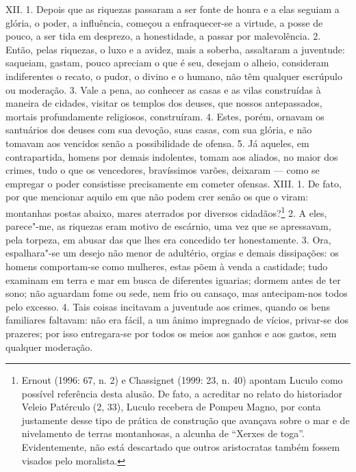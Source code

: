 XII. 1. Depois que as riquezas passaram a ser fonte de honra e a elas seguiam a
glória, o poder, a influência, começou a enfraquecer-se a virtude, a posse de
pouco, a ser tida em desprezo, a honestidade, a passar por malevolência. 2.
Então, pelas riquezas, o luxo e a avidez, mais a soberba, assaltaram a
juventude: saqueiam, gastam, pouco apreciam o que é seu, desejam o alheio,
consideram indiferentes o recato, o pudor, o divino e o humano, não têm
qualquer escrúpulo ou moderação. 3. Vale a pena, ao conhecer as casas e as
vilas construídas à maneira de cidades, visitar os templos dos deuses, que
nossos antepassados, mortais profundamente religiosos, construíram. 4. Estes,
porém, ornavam os santuários dos deuses com sua devoção, suas casas, com sua
glória, e não tomavam aos vencidos senão a possibilidade de ofensa. 5. Já
aqueles, em contrapartida, homens por demais indolentes, tomam aos aliados, no
maior dos crimes, tudo o que os vencedores, bravíssimos varões, deixaram ---
como se empregar o poder consistisse precisamente em cometer ofensas.  XIII. 1.
De fato, por que mencionar aquilo em que não podem crer senão os que o viram:
montanhas postas abaixo, mares aterrados por diversos cidadãos?\footnote{Ernout
(1996: 67, n. 2) e Chassignet (1999: 23, n. 40) apontam Luculo como
possível referência desta alusão. De fato, a acreditar no relato do historiador
Veleio Patérculo (2, 33), Luculo recebera de Pompeu Magno, por conta justamente
desse tipo de prática de construção que avançava sobre o mar e de nivelamento
de terras montanhosas, a alcunha de ``Xerxes de toga''. Evidentemente, não está
descartado que outros aristocratas também fossem visados pelo moralista.} 2. A
eles, parece"-me, as riquezas eram motivo de escárnio, uma vez que se
apressavam, pela torpeza, em abusar das que lhes era concedido ter
honestamente. 3. Ora, espalhara"-se um desejo não menor de adultério, orgias e
demais dissipações: os homens comportam-se como mulheres, estas põem à venda a
castidade; tudo examinam em terra e mar em busca de diferentes iguarias; dormem
antes de ter sono; não aguardam fome ou sede, nem frio ou cansaço, mas
antecipam-nos todos pelo excesso. 4. Tais coisas incitavam a juventude aos
crimes, quando os bens familiares faltavam: não era fácil, a um ânimo
impregnado de vícios, privar-se dos prazeres; por isso entregara-se por todos
os meios aos ganhos e aos gastos, sem qualquer moderação.

